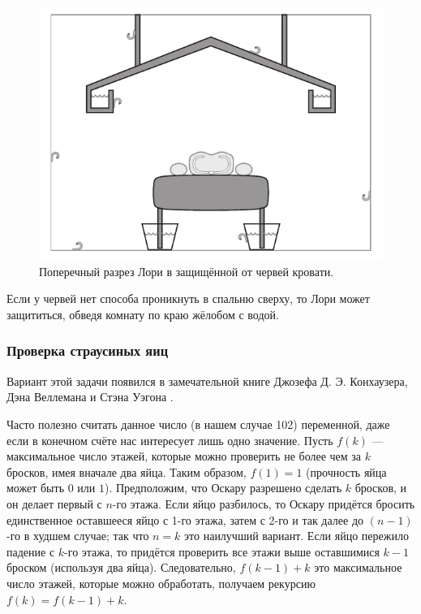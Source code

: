 \begin{figure}[h!]
\centering
\includegraphics[scale=0.5]{pics/chervi}
\caption{Поперечный разрез Лори в защищённой от червей кровати.}
\label{pic:chervi}
\end{figure}

Если у червей нет способа проникнуть в спальню сверху, то Лори может защититься, обведя комнату по краю жёлобом с водой.

\subsubsection*{Проверка страусиных яиц}

Вариант этой задачи появился в замечательной книге Джозефа Д. Э. Конхаузера, Дэна Веллемана и Стэна Уэгона \cite{42}.

Часто полезно считать данное число (в нашем случае 102) переменной, даже если в конечном счёте нас интересует лишь одно значение.
Пусть $f(k)$ --- максимальное число этажей, которые можно проверить не более чем за $k$ бросков, имея вначале два яйца.
Таким образом, $f(1) = 1$ (прочность яйца может быть $0$ или $1$).
Предположим, что Оскару разрешено сделать $k$ бросков, и он делает первый с $n$-го этажа.
Если яйцо разбилось, то Оскару придётся бросить единственное оставшееся яйцо с 1-го этажа, затем с 2-го и так далее до $(n-1)$-го в худшем случае;
так что $n = k$ это наилучший вариант.
Если яйцо пережило падение с $k$-го этажа, то придётся проверить все этажи выше оставшимися $k-1$ броском (используя два яйца).
Следовательно, $f(k - 1) + k$ это максимальное число этажей, которые можно обработать,
получаем рекурсию $f(k) = f(k - 1) + k$.

